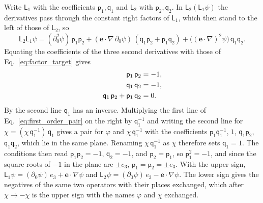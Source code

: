 \documentclass[aps,prd,onecolumn,tightenlines,nofootinbib,notitlepage,11pt,floatfix]{revtex4-2}
\theoremstyle{indentedtheorem}
\begin{document}
Write $\mathsf{L}_1$ with the coefficients $\mathsf{p}_1,\mathsf{q}_1$ and $\mathsf{L}_2$ with $\mathsf{p}_2,\mathsf{q}_2$. In $\mathsf{L}_2(\mathsf{L}_1\psi)$ the derivatives pass through the constant right factors of $\mathsf{L}_1$, which then stand to the left of those of $\mathsf{L}_2$, so
\begin{equation}
    \mathsf{L}_2 \mathsf{L}_1 \psi = (\partial_0^2\psi) \, \mathsf{p}_1\mathsf{p}_2 + (\mathbf{e}\cdot\nabla\,\partial_0\psi) \, (\mathsf{q}_1\mathsf{p}_2+\mathsf{p}_1\mathsf{q}_2) + \big((\mathbf{e}\cdot\nabla)^2\psi\big) \, \mathsf{q}_1\mathsf{q}_2 .
    \label{eq:factor_product}
\end{equation}
Equating the coefficients of the three second derivatives with those of Eq.~\eqref{eq:factor_target} gives
\begin{align}
    \mathsf{p}_1 \, \mathsf{p}_2 &= -1 , \notag\\
    \mathsf{q}_1 \, \mathsf{q}_2 &= -1 , \notag\\
    \mathsf{q}_1 \, \mathsf{p}_2 + \mathsf{p}_1 \, \mathsf{q}_2 &= 0 .
    \label{eq:factor_conditions}
\end{align}
By the second line $\mathsf{q}_1$ has an inverse. Multiplying the first line of Eq.~\eqref{eq:first_order_pair} on the right by $\mathsf{q}_1^{-1}$ and writing the second line for $\chi=(\chi\,\mathsf{q}_1^{-1})\,\mathsf{q}_1$ gives a pair for $\varphi$ and $\chi\,\mathsf{q}_1^{-1}$ with the coefficients $\mathsf{p}_1\mathsf{q}_1^{-1}$, $1$, $\mathsf{q}_1\mathsf{p}_2$, $\mathsf{q}_1\mathsf{q}_2$, which lie in the same plane. Renaming $\chi\,\mathsf{q}_1^{-1}$ as $\chi$ therefore sets $\mathsf{q}_1=1$. The conditions then read $\mathsf{p}_1\mathsf{p}_2=-1$, $\mathsf{q}_2=-1$, and $\mathsf{p}_2=\mathsf{p}_1$, so $\mathsf{p}_1^2=-1$, and since the square roots of $-1$ in the plane are $\pm e_3$, $\mathsf{p}_1=\mathsf{p}_2=\pm e_3$. With the upper sign, $\mathsf{L}_1\psi=(\partial_0\psi)\,e_3+\mathbf{e}\cdot\nabla\psi$ and $\mathsf{L}_2\psi=(\partial_0\psi)\,e_3-\mathbf{e}\cdot\nabla\psi$. The lower sign gives the negatives of the same two operators with their places exchanged, which after $\chi\to-\chi$ is the upper sign with the names $\varphi$ and $\chi$ exchanged.
\end{document}
